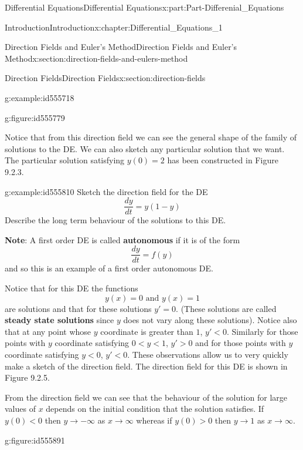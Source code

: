 \documentclass[oneside,10pt,]{book}
\newcommand{\terminology}[1]{\textbf{#1}}
\numberwithin{equation}{section}
\newcommand{\lt}{<}
\begin{document}
\begin{partptx}{Differential Equations}{}{Differential Equations}{}{}{x:part:Part-Differenial_Equations}
\begin{chapterptx}{Introduction}{}{Introduction}{}{}{x:chapter:Differential_Equations_1}
\begin{sectionptx}{Direction Fields and Euler's Method}{}{Direction Fields and Euler's Method}{}{}{x:section:direction-fields-and-eulers-method}
\begin{sectionptx}{Direction Fields}{}{Direction Fields}{}{}{x:section:direction-fields}
\begin{example}{}{g:example:id555718}
\begin{figureptx}{}{g:figure:id555779}{}
\tcblower
\end{figureptx}%
 Notice that from this direction field we can see the general shape of the family of solutions to the DE. We can also sketch any particular solution that we want. The particular solution satisfying \(y(0)=2\) has been constructed in Figure 9.2.3.%
\end{example}
\begin{example}{}{g:example:id555810}%
Sketch the direction field for the DE%
\begin{equation*}
\frac{dy}{dt}=y(1-y)
\end{equation*}
Describe the long term behaviour of the solutions to this DE.%
\par
\terminology{Note}: A first order DE is called \terminology{autonomous} if it is of the form%
\begin{equation*}
\frac{dy}{dt}=f(y)
\end{equation*}
and so this is an example of a first order autonomous DE.%
\par\smallskip%
\noindent\hypertarget{g:solution:id555801}{}Notice that for this DE the functions%
\begin{equation*}
y(x)=0 \textrm{ and }  y(x)=1
\end{equation*}
are solutions and that for these solutions \(y'=0\). (These solutions are called \terminology{steady state solutions} since \(y\) does not vary along these solutions). Notice also that at any point whose \(y\) coordinate is greater than \(1\), \(y'\lt 0\). Similarly for those points with \(y\) coordinate satisfying \(0\lt y\lt 1\), \(y'>0\) and for those points with \(y\) coordinate satisfying \(y\lt 0\), \(y'\lt 0\). These observations allow us to very quickly make a sketch of the direction field. The direction field for this DE is shown in Figure 9.2.5.%
\par
From the direction field we can see that the behaviour of the solution for large values of \(x\) depends on the initial condition that the solution satisfies. If \(y(0)\lt 0\) then \(y\rightarrow -\infty\) as \(x\rightarrow\infty\) whereas if \(y(0)>0\) then \(y\rightarrow 1\) as \(x\rightarrow\infty\).%
\begin{figureptx}{}{g:figure:id555891}{}%
\begin{image}{0.125}{0.75}{0.125}%

\end{image}
\end{figureptx}
\end{example}
\end{sectionptx}
\end{sectionptx}
\end{chapterptx}
\end{partptx}
\end{document}

